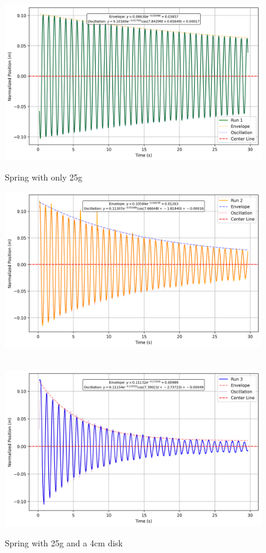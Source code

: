 \documentclass[12pt,letterpaper]{article}
\begin{document}
\begin{figure}[H]
\centering
{}
  \includegraphics[width=\linewidth]{images/2cm.png}
  \caption{Spring with only 25g}\label{fig:2cm}
\endminipage\hfill
{}
  \includegraphics[width=\linewidth]{images/4cm.png}
  \caption{Spring with 25g and a 4cm disk}\label{fig:4cm}
\endminipage\hfill
\\
  \includegraphics[width=\linewidth]{images/6cm.png}

\end{figure}
\end{document}
